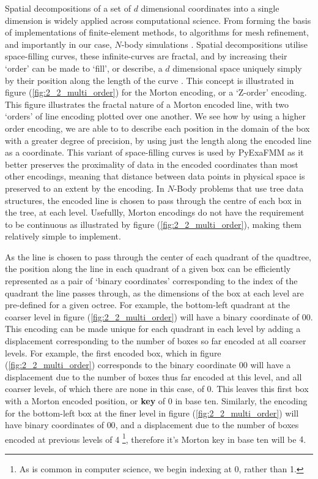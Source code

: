 Spatial decompositions of a set of $d$ dimensional coordinates into a single
dimension is widely applied across computational science.
From forming the basis of implementations of finite-element methods, to algorithms
for mesh refinement, and importantly in our case, $N$-body simulations
\cite{Sundar:2008:SIAM}. Spatial decompositions utilise space-filling curves,
these infinite-curves are fractal, and by increasing their `order' can be made
to `fill', or describe, a $d$ dimensional space uniquely simply by their position
along the length of the curve \cite{Campbell:2003:Williams}. This concept is
illustrated in figure (\ref{fig:2_2_multi_order}) for the Morton encoding, or a
`Z-order' encoding.  This figure illustrates the fractal nature of a Morton
encoded line, with two `orders' of line encoding plotted over one another. We see
how by using a higher order encoding, we are able to to describe each position
in the domain of the box with a greater degree of precision, by using just
the length along the encoded line as a coordinate. This variant of space-filling
curves is used by \gls{PyExaFMM} as it better preserves the proximality of data
in the encoded coordinates than most other encodings, meaning that distance
between data points in physical space is preserved to an extent by the encoding. In $N$-Body
problems that use tree data structures, the encoded line is chosen to pass through
the centre of each box in the tree, at each level. Usefullly, Morton encodings
do not have the requirement to be continuous as illustrated by figure
(\ref{fig:2_2_multi_order}), making them relatively simple to implement.

As the line is chosen to pass through the center of each quadrant of the quadtree,
 the position along the line in each quadrant of a given box can be efficiently represented
 as a pair of `binary coordinates' corresponding to the index of the quadrant the line
 passes through, as the dimensions of the box at each level are pre-defined for a
 given octree. For example, the bottom-left quadrant at the coarser level in figure (\ref{fig:2_2_multi_order})
 will have a binary coordinate of $00$. This encoding can be made unique for each
 quadrant in each level by adding a displacement corresponding to the number of boxes so far
 encoded at all coarser levels. For example, the first encoded box, which in figure (\ref{fig:2_2_multi_order})
 corresponds to the binary coordinate $00$ will have a displacement due to the
 number of boxes thus far encoded at this level, and all coarser levels, of which
 there are none in this case, of 0. This leaves this first box with a Morton encoded position,
 or \textbf{\gls{key}} of 0 in base ten. Similarly, the encoding for the bottom-left box at the finer
 level in figure (\ref{fig:2_2_multi_order}) will have binary coordinates of $00$,
 and a displacement due to the number of boxes encoded at previous levels of 4
 \footnote{As is common in computer science, we begin indexing at 0, rather than 1.},
therefore it's Morton \gls{key} in base ten will be $4$.

